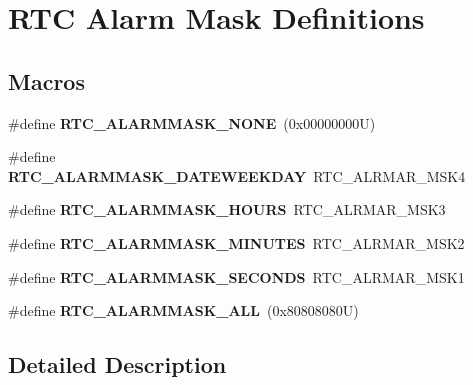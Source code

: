 \hypertarget{group___r_t_c___alarm_mask___definitions}{}\section{R\+TC Alarm Mask Definitions}
\label{group___r_t_c___alarm_mask___definitions}
\subsection*{Macros}
\begin{DoxyCompactItemize}
\item 
\mbox{\label{group___r_t_c___alarm_mask___definitions_ga051c19c4a3c3f12bcf672f35d03254ae}} 
\#define {\bfseries R\+T\+C\+\_\+\+A\+L\+A\+R\+M\+M\+A\+S\+K\+\_\+\+N\+O\+NE}~(0x00000000\+U)
\item 
\mbox{\label{group___r_t_c___alarm_mask___definitions_ga0bcc63ed1fe29a90fa8745cd3b98f73c}} 
\#define {\bfseries R\+T\+C\+\_\+\+A\+L\+A\+R\+M\+M\+A\+S\+K\+\_\+\+D\+A\+T\+E\+W\+E\+E\+K\+D\+AY}~R\+T\+C\+\_\+\+A\+L\+R\+M\+A\+R\+\_\+\+M\+S\+K4
\item 
\mbox{\label{group___r_t_c___alarm_mask___definitions_gaa8bfd0f98f4f53930a34a43af093af37}} 
\#define {\bfseries R\+T\+C\+\_\+\+A\+L\+A\+R\+M\+M\+A\+S\+K\+\_\+\+H\+O\+U\+RS}~R\+T\+C\+\_\+\+A\+L\+R\+M\+A\+R\+\_\+\+M\+S\+K3
\item 
\mbox{\label{group___r_t_c___alarm_mask___definitions_gafe9215f55d86f2f959af686539c5aa0a}} 
\#define {\bfseries R\+T\+C\+\_\+\+A\+L\+A\+R\+M\+M\+A\+S\+K\+\_\+\+M\+I\+N\+U\+T\+ES}~R\+T\+C\+\_\+\+A\+L\+R\+M\+A\+R\+\_\+\+M\+S\+K2
\item 
\mbox{\label{group___r_t_c___alarm_mask___definitions_gad404276351a285f7ede5a1ec53009353}} 
\#define {\bfseries R\+T\+C\+\_\+\+A\+L\+A\+R\+M\+M\+A\+S\+K\+\_\+\+S\+E\+C\+O\+N\+DS}~R\+T\+C\+\_\+\+A\+L\+R\+M\+A\+R\+\_\+\+M\+S\+K1
\item 
\mbox{\label{group___r_t_c___alarm_mask___definitions_gae5a5dc7b33c51c572ebc9cb58723fdd3}} 
\#define {\bfseries R\+T\+C\+\_\+\+A\+L\+A\+R\+M\+M\+A\+S\+K\+\_\+\+A\+LL}~(0x80808080\+U)
\end{DoxyCompactItemize}


\subsection{Detailed Description}
